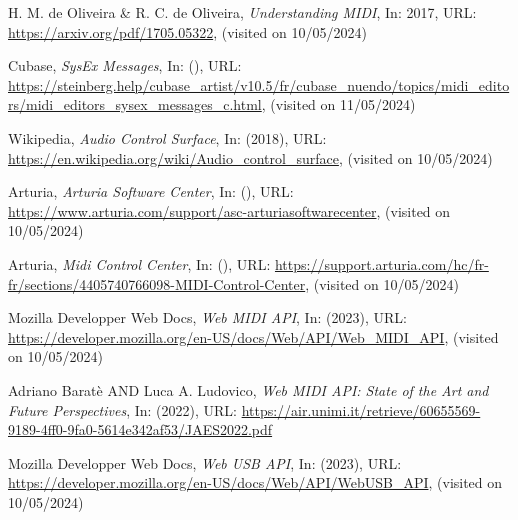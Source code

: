 \documentclass[francais]{rapportPFE}  %
\begin{document}


\renewcommand\refname{Bibliographie}



\begin{thebibliography}{9}

      H. M. de Oliveira \& R. C. de Oliveira,
      \textit{Understanding MIDI},
      In: 2017,
      URL: \url{https://arxiv.org/pdf/1705.05322},
      (visited on 10/05/2024)

        Cubase,
        \textit{SysEx Messages},
        In: (),
        URL: \url{https://steinberg.help/cubase_artist/v10.5/fr/cubase_nuendo/topics/midi_editors/midi_editors_sysex_messages_c.html},
        (visited on 11/05/2024)
    
        Wikipedia,
        \textit{Audio Control Surface},
        In: (2018),
        URL: \url{https://en.wikipedia.org/wiki/Audio_control_surface},
        (visited on 10/05/2024)

        Arturia,
        \textit{Arturia Software Center},
        In: (),
        URL: \url{https://www.arturia.com/support/asc-arturiasoftwarecenter},
        (visited on 10/05/2024)

        Arturia,
        \textit{Midi Control Center},
        In: (),
        URL: \url{https://support.arturia.com/hc/fr-fr/sections/4405740766098-MIDI-Control-Center},
        (visited on 10/05/2024)

        Mozilla Developper Web Docs,
        \textit{Web MIDI API},
        In: (2023),
        URL: \url{https://developer.mozilla.org/en-US/docs/Web/API/Web_MIDI_API},
        (visited on 10/05/2024)

    Adriano Baratè AND Luca A. Ludovico,
        \textit{Web MIDI API: State of the Art and Future
        Perspectives},
        In: (2022),
        URL: \url{https://air.unimi.it/retrieve/60655569-9189-4ff0-9fa0-5614e342af53/JAES2022.pdf}

    

    Mozilla Developper Web Docs,
    \textit{Web USB API},
    In: (2023),
        URL: \url{https://developer.mozilla.org/en-US/docs/Web/API/WebUSB_API},
        (visited on 10/05/2024)
    

\end{thebibliography}
\end{document}
